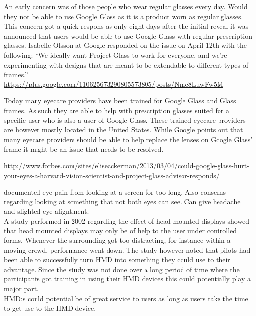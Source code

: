 An early concern was of those people who wear regular glasses every day. Would they not be able to use Google Glass as it is a product worn as regular glasses. This concern got a quick respons as only eight days after the initial reveal it was announced that users would be able to use Google Glass with regular prescription glasses. Isabelle Olsson at Google responded on the issue on April 12th with the following: ``We ideally want Project Glass to work for everyone, and we’re experimenting with designs that are meant to be extendable to different types of frames.''\\
\url{https://plus.google.com/110625673290805573805/posts/Nmc8LuwFw5M}

Today many eyecare providers have been trained for Google Glass and Glass frames. As such they are able to help with prescription glasses suited for a specific user who is also a user of Google Glass. These trained eyecare providers are however mostly located in the United States. While Google points out that many eyecare providers should be able to help replace the lenses on Google Glass' frame it might be an issue that needs to be resolved.\cite{frameProviders}\\ 

\cite{framesGlass} %

\url{http://www.forbes.com/sites/eliseackerman/2013/03/04/could-google-glass-hurt-your-eyes-a-harvard-vision-scientist-and-project-glass-advisor-responds/}

documented eye pain from looking at a screen for too long. Also conserns regarding looking at something that not both eyes can see. Can give headache and slighted eye aligntment.\\

A study performed in 2002 regarding the effect of head mounted displays showed that head mounted displays may only be of help to the user under controlled forms. Whenever the surrounding got too distracting, for instance within a moving crowd, performance went down. The study however noted that pilots had been able to successfully turn HMD into something they could use to their advantage. Since the study was not done over a long period of time where the participants got training in using their HMD devices this could potentially play a major part.\\

HMD:s could potential be of great service to users as long as users take the time to get use to the HMD device.\cite{laramee02}\\